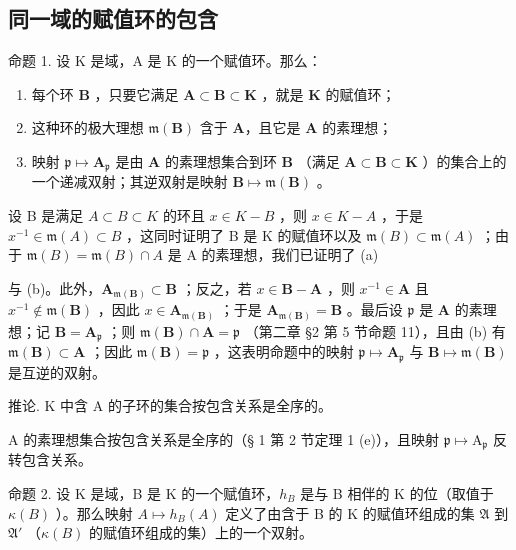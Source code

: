 \subsection{同一域的赋值环的包含}

命题 1. 设 K 是域，A 是 K 的一个赋值环。那么：

\begin{enumerate}
\def\labelenumi{(\alph{enumi})}
\item
  每个环 \(\mathbf{B}\) ，只要它满足 \(\mathbf{A} \subset \mathbf{B} \subset \mathbf{K}\) ，就是 \(\mathbf{K}\) 的赋值环；
\item
  这种环的极大理想 \(\mathfrak{m}(\mathbf{B})\) 含于 \(\mathbf{A}\)，且它是 \(\mathbf{A}\) 的素理想；
\item
映射 \(\mathfrak{p} \mapsto \mathbf{A}_{\mathfrak{p}}\) 是由 \(\mathbf{A}\) 的素理想集合到环 \(\mathbf{B}\) （满足 \(\mathbf{A} \subset \mathbf{B} \subset \mathbf{K}\) ）的集合上的一个递减双射；其逆双射是映射 \(\mathbf{B} \mapsto \mathfrak{m}(\mathbf{B})\) 。
\end{enumerate}

设 B 是满足 \(A \subset B \subset K\) 的环且 \(x \in K - B\) ，则 \(x \in K - A\) ，于是 \(x^{-1} \in \mathfrak{m}(A) \subset B\) ，这同时证明了 B 是 K 的赋值环以及 \(\mathfrak{m}(B) \subset \mathfrak{m}(A)\) ；由于 \(\mathfrak{m}(B) = \mathfrak{m}(B) \cap A\) 是 A 的素理想，我们已证明了 (a)

与 (b)。此外，\(\mathbf{A}_{\mathfrak{m}(\mathbf{B})} \subset \mathbf{B}\) ；反之，若 \(x \in \mathbf{B} - \mathbf{A}\) ，则 \(x^{-1} \in \mathbf{A}\) 且 \(x^{-1} \notin \mathfrak{m}(\mathbf{B})\) ，因此 \(x \in \mathbf{A}_{\mathfrak{m}(\mathbf{B})}\) ；于是 \(\mathbf{A}_{\mathfrak{m}(\mathbf{B})} = \mathbf{B}\) 。最后设 \(\mathfrak{p}\) 是 \(\mathbf{A}\) 的素理想；记 \(\mathbf{B} = \mathbf{A}_{\mathfrak{p}}\) ；则 \(\mathfrak{m}(\mathbf{B}) \cap \mathbf{A} = \mathfrak{p}\) （第二章 §2 第 5 节命题 11），且由 (b) 有 \(\mathfrak{m}(\mathbf{B}) \subset \mathbf{A}\) ；因此 \(\mathfrak{m}(\mathbf{B}) = \mathfrak{p}\) ，这表明命题中的映射 \(\mathfrak{p} \mapsto \mathbf{A}_{\mathfrak{p}}\) 与 \(\mathbf{B} \mapsto \mathfrak{m}(\mathbf{B})\) 是互逆的双射。

推论. K 中含 A 的子环的集合按包含关系是全序的。

A 的素理想集合按包含关系是全序的（§ 1 第 2 节定理 1 (e)），且映射 \(\mathfrak{p} \mapsto \mathrm{A}_{\mathfrak{p}}\) 反转包含关系。

命题 2. 设 K 是域，B 是 K 的一个赋值环，\(h_B\) 是与 B 相伴的 K 的位（取值于 \(\kappa(B)\) ）。那么映射 \(A \mapsto h_B(A)\) 定义了由含于 B 的 K 的赋值环组成的集 \(\mathfrak{A}\) 到 \(\mathfrak{A}'\) （\(\kappa(B)\) 的赋值环组成的集）上的一个双射。

